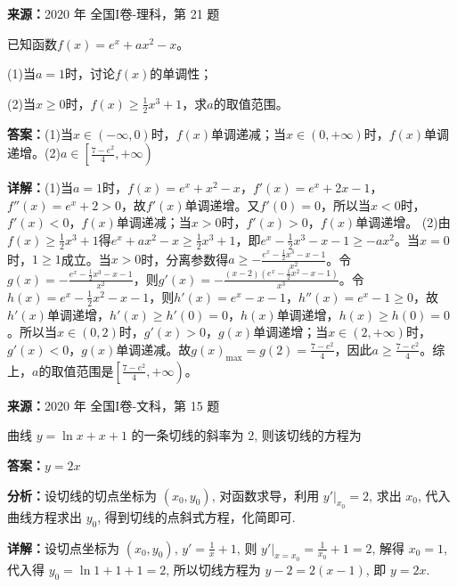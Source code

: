 \begin{question}[points=12]
\textbf{来源：}2020 年 全国I卷-理科，第 21 题\par
已知函数$f(x)=e^x+ax^2-x$。

(1)当$a=1$时，讨论$f(x)$的单调性；

(2)当$x\geq 0$时，$f(x)\geq\frac{1}{2}x^3+1$，求$a$的取值范围。
\begin{solution}
\textbf{答案：}(1)当$x\in(-\infty,0)$时，$f(x)$单调递减；当$x\in(0,+\infty)$时，$f(x)$单调递增。(2)$a\in\left[\frac{7-e^2}{4},+\infty\right)$

\textbf{详解：}(1)当$a=1$时，$f(x)=e^x+x^2-x$，$f'(x)=e^x+2x-1$，$f''(x)=e^x+2>0$，故$f'(x)$单调递增。又$f'(0)=0$，所以当$x<0$时，$f'(x)<0$，$f(x)$单调递减；当$x>0$时，$f'(x)>0$，$f(x)$单调递增。
(2)由$f(x)\geq\frac{1}{2}x^3+1$得$e^x+ax^2-x\geq\frac{1}{2}x^3+1$，即$e^x-\frac{1}{2}x^3-x-1\geq -ax^2$。当$x=0$时，$1\geq1$成立。当$x>0$时，分离参数得$a\geq-\frac{e^x-\frac{1}{2}x^3-x-1}{x^2}$。令$g(x)=-\frac{e^x-\frac{1}{2}x^3-x-1}{x^2}$，则$g'(x)=-\frac{(x-2)\left(e^x-\frac{1}{2}x^2-x-1\right)}{x^3}$。令$h(x)=e^x-\frac{1}{2}x^2-x-1$，则$h'(x)=e^x-x-1$，$h''(x)=e^x-1\geq0$，故$h'(x)$单调递增，$h'(x)\geq h'(0)=0$，$h(x)$单调递增，$h(x)\geq h(0)=0$。所以当$x\in(0,2)$时，$g'(x)>0$，$g(x)$单调递增；当$x\in(2,+\infty)$时，$g'(x)<0$，$g(x)$单调递减。故$g(x)_{\max}=g(2)=\frac{7-e^2}{4}$，因此$a\geq\frac{7-e^2}{4}$。综上，$a$的取值范围是$\left[\frac{7-e^2}{4},+\infty\right)$。
\end{solution}
\end{question}

\begin{question}[points=5]
\textbf{来源：}2020 年 全国I卷-文科，第 15 题\par
曲线 $y = \ln x + x + 1$ 的一条切线的斜率为 $2$, 则该切线的方程为
\fillin[{$y = 2x$}]
\begin{solution}
\textbf{答案：}$y = 2x$

\textbf{分析：}设切线的切点坐标为 $(x_0, y_0)$, 对函数求导，利用 $y'|_{x_0} = 2$, 求出 $x_0$, 代入曲线方程求出 $y_0$, 得到切线的点斜式方程，化简即可.

\textbf{详解：}设切点坐标为 $(x_0, y_0)$, $y' = \frac{1}{x} + 1$, 则 $y'|_{x=x_0} = \frac{1}{x_0} + 1 = 2$, 解得 $x_0 = 1$, 代入得 $y_0 = \ln 1 + 1 + 1 = 2$, 所以切线方程为 $y - 2 = 2(x - 1)$, 即 $y = 2x$.
\end{solution}
\end{question}

